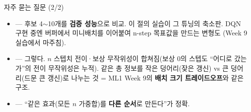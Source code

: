 \begin{frame}{자주 묻는 질문 (2/2)}
  \begin{itemize}
    \item {} --- 후보 4$\sim$10개를
      \textbf{검증 성능}으로 비교. 이 절의 실습이 그 튜닝의 축소판.
      DQN 구현 중엔 버퍼에서 미니배치를 이어붙여 n-step 목표값을
      만드는 변형도 (Week 9 실습에서 마주침).
    \item {}
      --- 그렇다. $n$ 스텝치 전이·보상 무작위성이 합쳐짐(보상 0의
      스텝도 ``어디로 갔는가''의 전이 무작위성은 누적). 같은 총
      정보를 작은 덩어리(잦은 갱신) vs 큰 덩어리(드문 큰 갱신)로
      나누는 것 = ML1 Week 9의 \textbf{배치 크기 트레이드오프}와
      같은 구조.
    \item {} --- ``같은
      효과(모든 $n$ 가중합)를 \textbf{다른 순서}로 만든다''가 정확.
  \end{itemize}
\end{frame}
